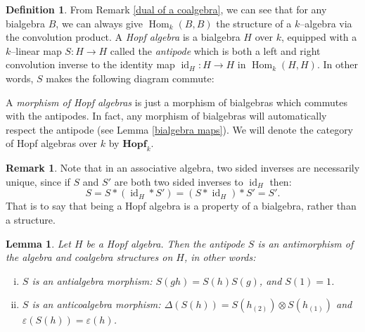 \documentclass{article}
\theoremstyle{plain}
\newtheorem{Lemma}[Th]{Lemma}
\theoremstyle{definition}
\newtheorem{Def}[Th]{Definition}
\newtheorem{Rem}[Th]{Remark}
\DeclareMathOperator{\id}{id}
\DeclareMathOperator{\Hom}{Hom}
\begin{document}
\begin{Def}
From Remark \ref{dual of a coalgebra}, we can see that for any bialgebra $B$, we can always give $\Hom_k(B, B)$ the structure of a $k$--algebra via the convolution product. A \textit{Hopf algebra} is a bialgebra $H$ over $k$, equipped with a $k$--linear map $S\colon H\to H$ called the \textit{antipode} which is both a left and right convolution inverse to the identity map $\id_H\colon H\to H$ in $\Hom_k(H, H)$. In other words, $S$ makes the following diagram commute:
        \begin{center}
        \end{center}
       A \textit{morphism of Hopf algebras} is just a morphism of bialgebras which commutes with the antipodes. In fact, any morphism of bialgebras will automatically respect the antipode (see Lemma \ref{bialgebra maps}). We will denote the category of Hopf algebras over $k$ by $\textbf{Hopf}_k$.
 \end{Def}
   

\begin{Rem}
 Note that in an associative algebra, two sided inverses are necessarily unique, since if $S$ and $S'$ are both two sided inverses to $\id_H$ then: 
    \[
    S = S \ast (\id_H \ast 
 S') = (S \ast \id_H) \ast S' = S'.
    \]
    That is to say that being a Hopf algebra is a property of a bialgebra, rather than a structure.    
\end{Rem}
       


\begin{Lemma}\label{Properties of the antipode}
        Let $H$ be a Hopf algebra. Then the antipode $S$ is an antimorphism of the algebra and coalgebra structures on $H$, in other words:
        \begin{enumerate}[(i)]
            \item $S$ is an antialgebra morphism: $S(gh)=S(h)S(g)$, and $S(1)=1$.
            \item $S$ is an anticoalgebra morphism: $\Delta(S(h))= S(h_{(2)})\otimes S(h_{(1)})$ and $\varepsilon(S(h))=\varepsilon(h)$.
        \end{enumerate}
\end{Lemma}
\end{document}
